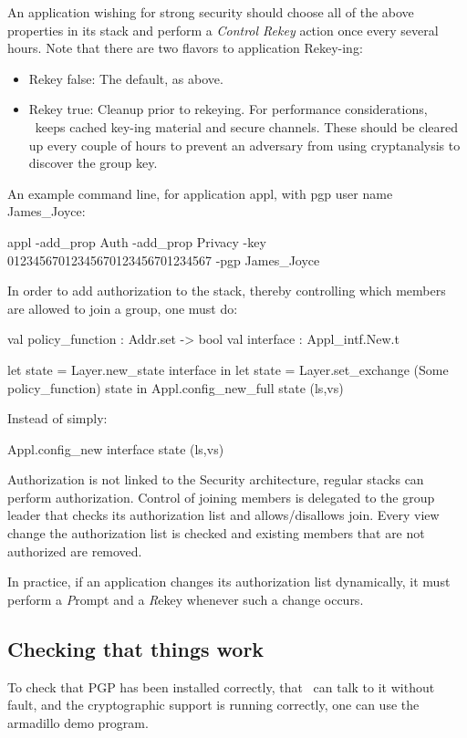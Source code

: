 An application wishing for strong security should choose all of the
above properties in its stack and perform a {\it Control Rekey} action
once every several hours. Note that there are two flavors to
application Rekey-ing:
\begin{itemize}
\item{Rekey false:} The default, as above.
\item{Rekey true:} Cleanup prior to rekeying. For performance
considerations, \ensemble\ keeps cached key-ing material and secure
channels. These should be cleared up every couple of hours to prevent
an adversary from using cryptanalysis to discover the group key. 
\end{itemize}

An example command line, for application appl, with pgp user name James\_Joyce:
\begin{codebox}
appl -add\_prop Auth -add\_prop Privacy -key 01234567012345670123456701234567 
     -pgp James\_Joyce
\end{codebox}

In order to add authorization to the stack, thereby controlling which
members are allowed to join a group, one must do:

\begin{codebox}
  val policy_function : Addr.set -> bool
  val interface : Appl_intf.New.t

  let state = Layer.new_state interface in
  let state = Layer.set_exchange (Some policy_function) state in 
  Appl.config_new_full state (ls,vs)
\end{codebox}

Instead of simply:
\begin{codebox}
  Appl.config_new interface state (ls,vs)
\end{codebox}

Authorization is not linked to the Security architecture, regular
stacks can perform authorization. Control of joining members is
delegated to the group leader that checks its authorization list and
allows/disallows join. Every view change the authorization list is checked and
existing members that are not authorized are removed. 

In practice, if an application changes its authorization list
dynamically, it must perform a {\emph Prompt} and a {\emph Rekey}
whenever such a change occurs.

\subsection{Checking that things work}
To check that PGP has been installed correctly, that \ensemble\ can
talk to it without fault, and the cryptographic support is running
correctly, one can use the armadillo demo program. 


